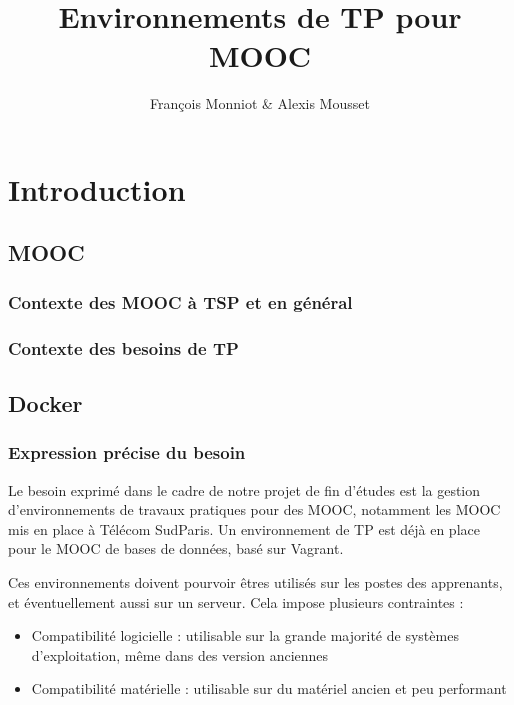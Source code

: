 \documentclass[a4paper,11pt]{report}
\title{Environnements de TP pour MOOC}
\author{François Monniot \& Alexis Mousset}
\begin{document}
\maketitle
\tableofcontents

\begin{abstract}

\end{abstract}
\pagestyle{fancy}
\chapter{Introduction}
\pagestyle{fancy}
\section{MOOC}

\subsection{Contexte des MOOC à TSP et en général}

\subsection{Contexte des besoins de TP}

\section{Docker}

\subsection{Expression précise du besoin}

Le besoin exprimé dans le cadre de notre projet de fin d'études est la gestion d'environnements de travaux pratiques pour des MOOC, notamment les MOOC mis en place à Télécom SudParis. Un environnement de TP est déjà en place pour le MOOC de bases de données, basé sur Vagrant.

Ces environnements doivent pourvoir êtres utilisés sur les postes des apprenants, et éventuellement aussi sur un serveur. Cela impose plusieurs contraintes :
\begin{itemize}
  \item Compatibilité logicielle : utilisable sur la grande majorité de systèmes d'exploitation, même dans des version anciennes
  \item Compatibilité matérielle : utilisable sur du matériel ancien et peu performant
\end{itemize}
\end{document}

